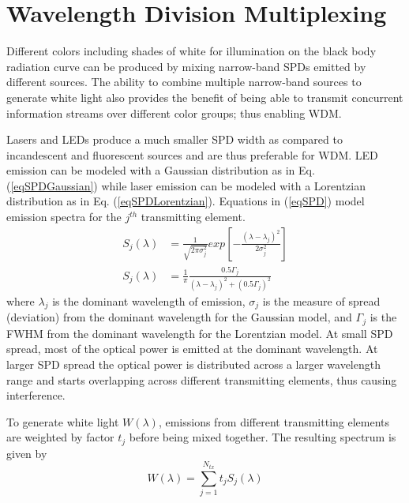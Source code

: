 \section{Wavelength Division Multiplexing}\label{sec:wdm}
Different colors including shades of white for illumination on the black body radiation curve can be produced by mixing narrow-band SPDs emitted by different sources. The ability to combine multiple narrow-band sources to generate white light also provides the benefit of being able to transmit concurrent information streams over different color groups; thus enabling WDM. 

Lasers and LEDs produce a much smaller SPD width as compared to incandescent and fluorescent sources and are thus preferable for WDM. LED emission can be modeled with a Gaussian distribution as in Eq. (\ref{eqSPDGaussian}) while laser emission can be modeled with a Lorentzian distribution as in Eq. (\ref{eqSPDLorentzian}). Equations in (\ref{eqSPD}) model emission spectra for the $j^{th}$ transmitting element.
\setlength{\arraycolsep}{0.0em}
\begin{subequations}
\begin{align}
S_j(\lambda) &= \frac{1}{\sqrt{2\pi\sigma_j^2}}exp\left[-\frac{(\lambda-\lambda_j)^2}{2\sigma_j^2}\right]\label{eqSPDGaussian}\\
S_j(\lambda) &= \frac{1}{\pi}\frac{0.5\Gamma_j}{(\lambda-\lambda_j)^2 + (0.5\Gamma_j)^2}\label{eqSPDLorentzian}
\end{align}
\label{eqSPD}
\end{subequations}
\setlength{\arraycolsep}{5pt} 
where $\lambda_j$ is the dominant wavelength of emission, $\sigma_j$ is the measure of spread (deviation) from the dominant wavelength for the Gaussian model, and $\Gamma_j$ is the FWHM from the dominant wavelength for the Lorentzian model. At small SPD spread, most of the optical power is emitted at the dominant wavelength. At larger SPD spread the optical power is distributed across a larger wavelength range and starts overlapping across different transmitting elements, thus causing interference.

To generate white light $W(\lambda)$, emissions from different transmitting elements are weighted by factor $t_j$ before being mixed together. The resulting spectrum is given by
\begin{equation}
	\label{eqWhite}
	W(\lambda) = \sum_{j=1}^{N_{tx}}t_jS_j(\lambda)
\end{equation}

